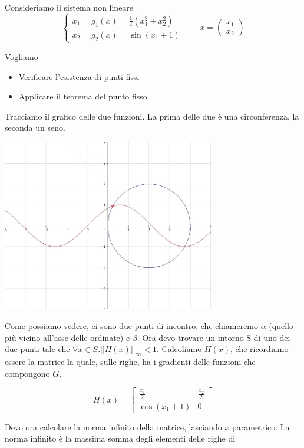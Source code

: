 \begin{example}
Consideriamo il sistema non lineare
 $$ \left\{
\begin{array}{l}
 x_1 = g_1(x) = \frac{1}{4}(x_{1}^{2} + x_{2}^{2}) \\ x_2 = g_2(x) =
 \sin(x_1 + 1)
\end{array}
\right. \qquad x= \begin{pmatrix} x_1 \\ x_2
    \end{pmatrix}
$$

Vogliamo

\begin{itemize}
 \item Verificare l'esistenza di punti fissi
 \item Applicare il teorema del punto fisso
\end{itemize}

Tracciamo il grafico delle due funzioni. La prima delle due \`e una
circonferenza, la seconda un seno.

\includegraphics[width=350px]{imgs/121701.jpg}

Come possiamo vedere, ci sono due punti di incontro, che chiameremo $
\alpha $ (quello pi\`u vicino all'asse delle ordinate) e $ \beta
$. Ora devo trovare un intorno S di uno dei due punti tale che $
\forall x \in S.||H(x)||_{\infty} < 1 $. Calcoliamo $ H(x) $, che
ricordiamo essere la matrice la quale, sulle righe, ha i gradienti
delle funzioni che compongono $G$.

$$ H(x) = \left[\begin{array}{cc} \frac{x_1}{2} & \frac{x_2}{2}
    \\ \cos(x_1 +1)& 0
\end{array}          
\right]
$$

Devo ora calcolare la norma infinito della matrice, lasciando $x$
parametrico. La norma infinito \`e la massima somma degli elementi
delle righe di


\end{example}
